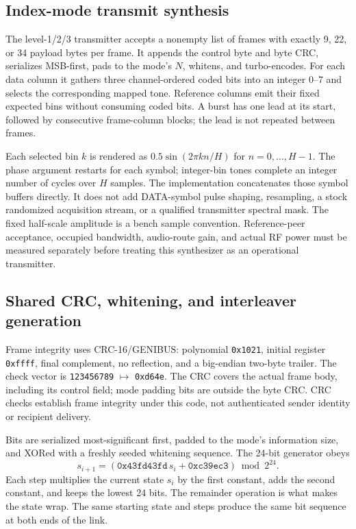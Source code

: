 \subsection{Index-mode transmit synthesis}
The level-1/2/3 transmitter accepts a nonempty list of frames with exactly
9, 22, or 34 payload bytes per frame. It appends the control byte and byte CRC,
serializes MSB-first, pads to the mode's $N$, whitens, and turbo-encodes. For
each data column it gathers three channel-ordered coded bits into an integer
0--7 and selects the corresponding mapped tone. Reference columns emit their
fixed expected bins without consuming coded bits. A burst has one lead at its
start, followed by consecutive frame-column blocks; the lead is not repeated
between frames.

Each selected bin $k$ is rendered as $0.5\sin(2\pi kn/H)$ for $n=0,\ldots,H-1$.
The phase argument restarts for each symbol; integer-bin tones complete an
integer number of cycles over $H$ samples. The implementation concatenates
those symbol buffers directly. It does not add DATA-symbol pulse shaping,
resampling, a stock randomized acquisition stream, or a qualified transmitter
spectral mask. The fixed half-scale amplitude is a bench sample convention.
Reference-peer acceptance, occupied bandwidth, audio-route gain, and actual
RF power must be measured separately before treating this synthesizer as an
operational transmitter.

\subsection{Shared CRC, whitening, and interleaver generation}
Frame integrity uses CRC-16/GENIBUS: polynomial \texttt{0x1021}, initial register
\texttt{0xffff}, final complement, no reflection, and a big-endian two-byte
trailer. The check vector is \texttt{123456789} $\mapsto$ \texttt{0xd64e}.
The CRC covers the actual frame body, including its control field; mode padding
bits are outside the byte CRC. CRC checks establish frame integrity under this
code, not authenticated sender identity or recipient delivery.

Bits are serialized most-significant first, padded to the mode's information
size, and XORed with a freshly seeded whitening sequence. The 24-bit generator
obeys
\[
 s_{i+1}=(\texttt{0x43fd43fd}\,s_i+\texttt{0xc39ec3})\bmod 2^{24}.
\]
Each step multiplies the current state $s_i$ by the first constant,
adds the second constant, and keeps the lowest 24 bits. The remainder
operation is what makes the state wrap. The same starting state and
steps produce the same bit sequence at both ends of the link.

